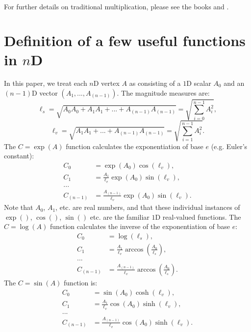 \documentclass[12pt]{article}
\begin{document}
For further details on traditional multiplication, please see the books \cite{sedenion} and \cite{quaternion}.







\section{Definition of a few useful functions in $n$D}

In this paper, we treat each $n$D vertex $A$ as consisting of a $1$D scalar $A_0$ and an $(n - 1)$D vector $(A_1, ..., A_{(n-1)})$.
The magnitude measures are:
\begin{equation}
\ell_s = \sqrt{A_0 A_0 + A_1 A_1 + ... + A_{(n-1)} A_{(n-1)}} = \sqrt{\sum _{i=0}^{n-1} A_i^2},
\end{equation}
\begin{equation}
\ell_v = \sqrt{A_1 A_1 + ... + A_{(n-1)} A_{(n-1)}} = \sqrt{\sum _{i=1}^{n-1} A_i^2}.
\end{equation}
The $C = \exp(A)$ function calculates the exponentiation of base $e$ (e.g. Euler's constant): 
\begin{equation}
\begin{split}
C_0 &= \exp(A_0) \cos(\ell_v), \\
C_1 &= \frac{A_1}{\ell_v} \exp(A_0) \sin(\ell_v), \\
...\\
C_{(n-1)} &= \frac{A_{(n-1)}}{\ell_v} \exp(A_0) \sin(\ell_v).
\end{split}
\end{equation}
Note that $A_0$, $A_1$, etc. are real numbers, and that these individual instances of $\exp()$, $\cos()$, $\sin()$ etc. are the familiar $1$D real-valued functions.
The $C = \log(A)$ function calculates the inverse of the exponentiation of base $e$:
\begin{equation}
\begin{split}
C_0 &= \log(\ell_s), \\
C_1 &= \frac{A_1}{\ell_v} \arccos\left( \frac{A_0}{\ell_s} \right), \\
...\\
C_{(n-1)} &= \frac{A_{(n-1)}}{\ell_v} \arccos\left( \frac{A_0}{\ell_s} \right).
\end{split}
\end{equation}
The $C = \sin(A)$ function is:
\begin{equation}
\begin{split}
C_0 &= \sin(A_0) \cosh(\ell_v), \\
C_1 &= \frac{A_1}{\ell_v} \cos(A_0) \sinh(\ell_v), \\
... \\
C_{(n-1)} &= \frac{A_{(n-1)}}{\ell_v} \cos(A_0) \sinh(\ell_v).
\end{split}
\end{equation}
\end{document}
